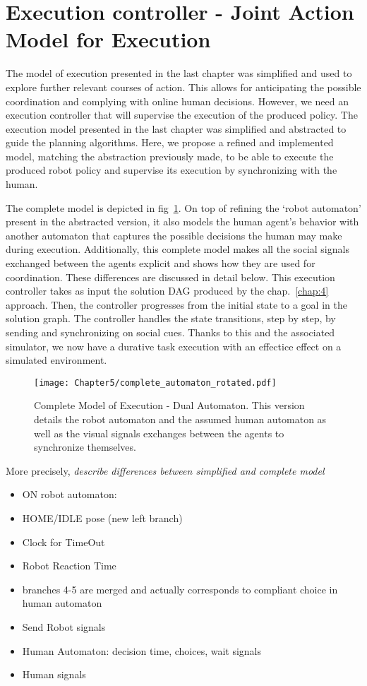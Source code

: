 \section{Execution controller - Joint Action Model for Execution}

The model of execution presented in the last chapter was simplified and used to explore further relevant courses of action. This allows for anticipating the possible coordination and complying with online human decisions. 
However, we need an execution controller that will supervise the execution of the produced policy. The execution model presented in the last chapter was simplified and abstracted to guide the planning algorithms. Here, we propose a refined and implemented model, matching the abstraction previously made, to be able to execute the produced robot policy and supervise its execution by synchronizing with the human.

The complete model is depicted in fig~\ref{fig:complete_model_exec}. On top of refining the `robot automaton' present in the abstracted version, it also models the human agent's behavior with another automaton that captures the possible decisions the human may make during execution. Additionally, this complete model makes all the social signals exchanged between the agents explicit and shows how they are used for coordination. These differences are discussed in detail below. This execution controller takes as input the solution DAG produced by the chap.~\ref{chap:4} approach. Then, the controller progresses from the initial state to a goal in the solution graph. The controller handles the state transitions, step by step, by sending and synchronizing on social cues. Thanks to this and the associated simulator, we now have a durative task execution with an effectice effect on a simulated environment.


\begin{figure}
    \centering
    \texttt{[image: Chapter5/complete\_automaton\_rotated.pdf]}
    \caption{Complete Model of Execution - Dual Automaton. This version details the robot automaton and the assumed human automaton as well as the visual signals exchanges between the agents to synchronize themselves.}
    \label{fig:complete_model_exec}
\end{figure}

More precisely, \textit{describe differences between simplified and complete model}
\begin{itemize}
    \item ON robot automaton:
    \item HOME/IDLE pose (new left branch)
    \item Clock for TimeOut
    \item Robot Reaction Time
    \item branches 4-5 are merged and actually corresponds to compliant choice in human automaton
    \item Send Robot signals 
    \item Human Automaton: decision time, choices, wait signals
    \item Human signals
\end{itemize}

